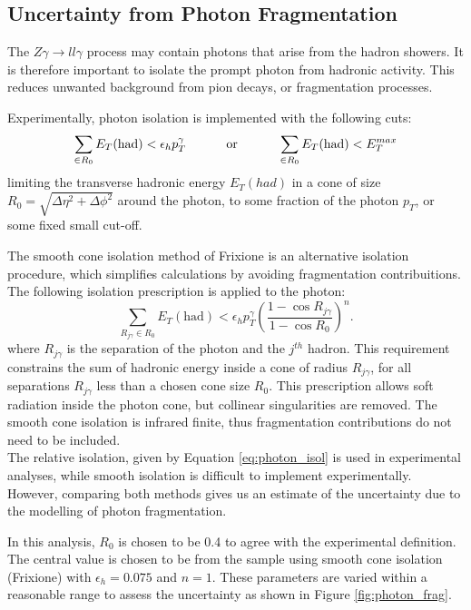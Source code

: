 \documentclass[11pt,a4paper,final]{report}
\newcommand{\Zgam}{$Z\gamma\to ll\gamma$ }
\begin{document}
\subsection{Uncertainty from Photon Fragmentation}
The \Zgam process may contain photons that arise from the hadron showers. It is therefore important to isolate the prompt photon from hadronic activity. This reduces unwanted background from pion decays, or fragmentation processes.

Experimentally, photon isolation is implemented with the following cuts:
\begin{equation}
\sum_{\in R_0} E_T(\text{had}) < \epsilon_h p_T^\gamma \text{\hspace{1cm} or \hspace{1cm}} \sum_{\in R_0} E_T(\text{had}) < E_T^{max}
\end{equation}
\label{eq:photon_isol}
limiting the transverse hadronic energy $E_T(had)$ in a cone of size $R_0 = \sqrt{\Delta\eta^2 + \Delta\phi^2}$ around the photon, to some fraction of the photon $p_T$, or some fixed small cut-off.

The smooth cone isolation method of Frixione \cite{frixione} is an alternative isolation procedure, which simplifies calculations by avoiding fragmentation contribuitions. The following isolation prescription is applied to the photon:
\begin{equation}
	\sum_{R_{j\gamma} \in R_0} E_T(\text{had}) < \epsilon_h p_T^\gamma \left(\frac{1-\cos R_{j\gamma}}{1-\cos R_0}\right)^n.
\end{equation}
\label{eq:frix_isol}
where $R_{j\gamma}$ is the separation of the photon and the $j^{th}$ hadron. This requirement constrains the sum of hadronic energy inside a cone of radius $R_{j\gamma}$, for all separations $R_{j\gamma}$ less than a chosen cone size $R_0$. This prescription allows soft radiation inside the photon cone, but collinear singularities are removed. The smooth cone isolation is infrared finite, thus fragmentation contributions do not need to be included.\\
The relative isolation, given by Equation \ref{eq:photon_isol} is used in experimental analyses, while smooth isolation is difficult to implement experimentally. However, comparing both methods gives us an estimate of the uncertainty due to the modelling of photon fragmentation.

In this analysis, $R_0$ is chosen to be 0.4 to agree with the experimental definition. The central value is chosen to be from the sample using smooth cone isolation (Frixione) with $\epsilon_h = 0.075$ and $n=1$. These parameters are varied within a reasonable range to assess the uncertainty as shown in Figure \ref{fig:photon_frag}.
\end{document}
